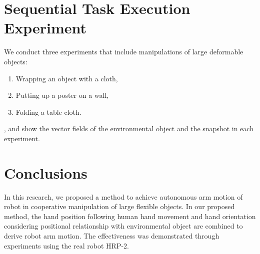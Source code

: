 \section{Sequential Task Execution Experiment}
\label{sec:ex}
We conduct three experiments that include manipulations of large deformable objects:

\begin{enumerate}
  \item Wrapping an object with a cloth,
  \item Putting up a poster on a wall,
  \item Folding a table cloth.
\end{enumerate}

,  and  show the vector fields of the environmental object and the snapshot in each experiment.

\section{Conclusions}
In this research, we proposed a method to achieve autonomous arm motion of robot in cooperative manipulation of large flexible objects. In our proposed method, the hand position following human hand movement and hand orientation considering positional relationship with environmental object are combined to derive robot arm motion. The effectiveness was demonstrated through experiments using the real robot HRP-2. %

